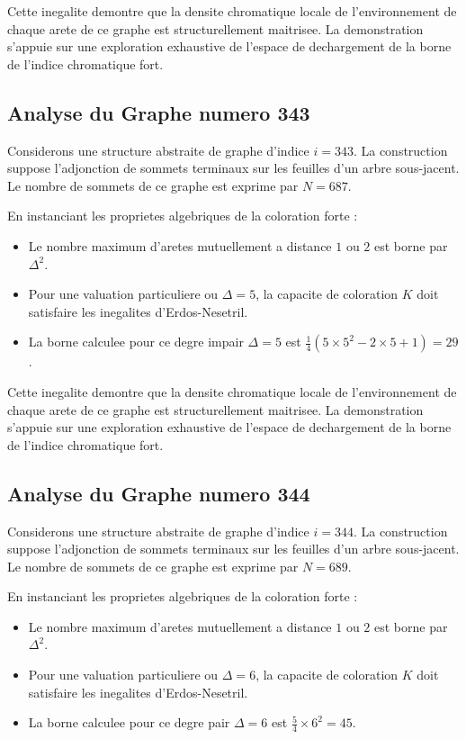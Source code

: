\documentclass[11pt,a4paper]{article}
\begin{document}
Cette inegalite demontre que la densite chromatique locale de l'environnement de chaque arete de ce graphe est structurellement maitrisee. La demonstration s'appuie sur une exploration exhaustive de l'espace de dechargement de la borne de l'indice chromatique fort.

\subsection{Analyse du Graphe numero 343}
Considerons une structure abstraite de graphe d'indice $i = 343$. La construction suppose l'adjonction de sommets terminaux sur les feuilles d'un arbre sous-jacent. Le nombre de sommets de ce graphe est exprime par $N = 687$.

En instanciant les proprietes algebriques de la coloration forte :
\begin{itemize}
\item Le nombre maximum d'aretes mutuellement a distance $1$ ou $2$ est borne par $\Delta^2$.
\item Pour une valuation particuliere ou $\Delta = 5$, la capacite de coloration $K$ doit satisfaire les inegalites d'Erdos-Nesetril.
\item La borne calculee pour ce degre impair $\Delta = 5$ est $\frac{1}{4}(5 \times 5^2 - 2 \times 5 + 1) = 29$.
\end{itemize}

Cette inegalite demontre que la densite chromatique locale de l'environnement de chaque arete de ce graphe est structurellement maitrisee. La demonstration s'appuie sur une exploration exhaustive de l'espace de dechargement de la borne de l'indice chromatique fort.

\subsection{Analyse du Graphe numero 344}
Considerons une structure abstraite de graphe d'indice $i = 344$. La construction suppose l'adjonction de sommets terminaux sur les feuilles d'un arbre sous-jacent. Le nombre de sommets de ce graphe est exprime par $N = 689$.

En instanciant les proprietes algebriques de la coloration forte :
\begin{itemize}
\item Le nombre maximum d'aretes mutuellement a distance $1$ ou $2$ est borne par $\Delta^2$.
\item Pour une valuation particuliere ou $\Delta = 6$, la capacite de coloration $K$ doit satisfaire les inegalites d'Erdos-Nesetril.
\item La borne calculee pour ce degre pair $\Delta = 6$ est $\frac{5}{4} \times 6^2 = 45$.
\end{itemize}
\end{document}
